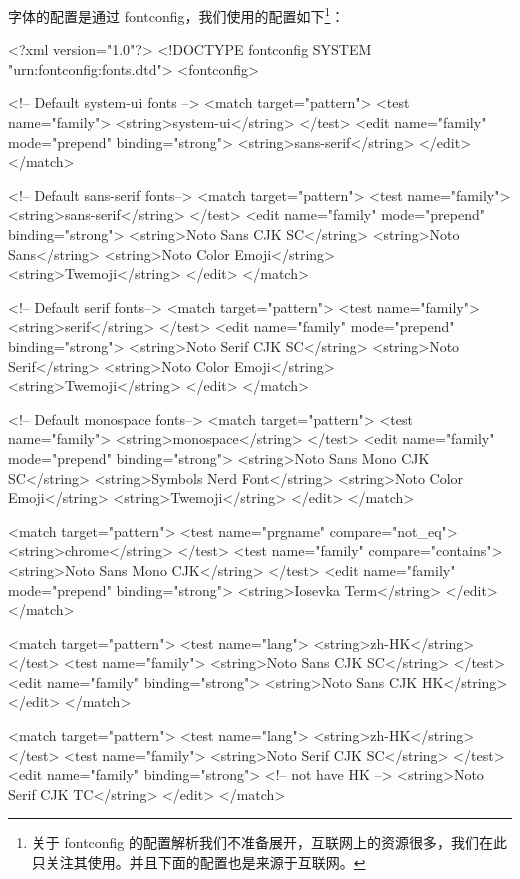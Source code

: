 字体的配置是通过 fontconfig，我们使用的配置如下\footnote{关于 fontconfig 的配置解析我们不准备展开，互联网上的资源很多，我们在此只关注其使用。并且下面的配置也是来源于互联网。}：
\begin{lstcode}[numbers=none]
<?xml version="1.0"?>
<!DOCTYPE fontconfig SYSTEM "urn:fontconfig:fonts.dtd">
<fontconfig>

  <!-- Default system-ui fonts -->
  <match target="pattern">
    <test name="family">
      <string>system-ui</string>
    </test>
    <edit name="family" mode="prepend" binding="strong">
      <string>sans-serif</string>
    </edit>
  </match>

  <!-- Default sans-serif fonts-->
  <match target="pattern">
    <test name="family">
      <string>sans-serif</string>
    </test>
    <edit name="family" mode="prepend" binding="strong">
      <string>Noto Sans CJK SC</string>
      <string>Noto Sans</string>
      <string>Noto Color Emoji</string>
      <string>Twemoji</string>
    </edit>
  </match>

  <!-- Default serif fonts-->
  <match target="pattern">
    <test name="family">
      <string>serif</string>
    </test>
    <edit name="family" mode="prepend" binding="strong">
      <string>Noto Serif CJK SC</string>
      <string>Noto Serif</string>
      <string>Noto Color Emoji</string>
      <string>Twemoji</string>
    </edit>
  </match>

  <!-- Default monospace fonts-->
  <match target="pattern">
    <test name="family">
      <string>monospace</string>
    </test>
    <edit name="family" mode="prepend" binding="strong">
      <string>Noto Sans Mono CJK SC</string>
      <string>Symbols Nerd Font</string>
      <string>Noto Color Emoji</string>
      <string>Twemoji</string>
    </edit>
  </match>

  <match target="pattern">
    <test name="prgname" compare="not_eq">
      <string>chrome</string>
    </test>
    <test name="family" compare="contains">
      <string>Noto Sans Mono CJK</string>
    </test>
    <edit name="family" mode="prepend" binding="strong">
      <string>Iosevka Term</string>
    </edit>
  </match>

  
  <match target="pattern">
    <test name="lang">
      <string>zh-HK</string>
    </test>
    <test name="family">
      <string>Noto Sans CJK SC</string>
    </test>
    <edit name="family" binding="strong">
      <string>Noto Sans CJK HK</string>
    </edit>
  </match>

  <match target="pattern">
    <test name="lang">
      <string>zh-HK</string>
    </test>
    <test name="family">
      <string>Noto Serif CJK SC</string>
    </test>
    <edit name="family" binding="strong">
      <!-- not have HK -->
      <string>Noto Serif CJK TC</string>
    </edit>
  </match>


\end{lstcode}
